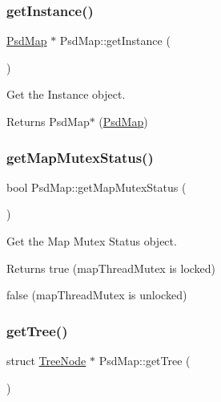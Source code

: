 \subsubsection{\texorpdfstring{get\+Instance()}{getInstance()}}
{\footnotesize\ttfamily \hyperlink{class_psd_map}{Psd\+Map} $\ast$ Psd\+Map\+::get\+Instance (\begin{DoxyParamCaption}{ }\end{DoxyParamCaption})\hspace{0.3cm}{\ttfamily [static]}}



Get the Instance object. 

\begin{DoxyReturn}{Returns}
Psd\+Map$\ast$ (\hyperlink{class_psd_map}{Psd\+Map}) 
\end{DoxyReturn}
\mbox{\label{class_psd_map_a411472433a3037b0245e9c9f699672b4}} 
\subsubsection{\texorpdfstring{get\+Map\+Mutex\+Status()}{getMapMutexStatus()}}
{\footnotesize\ttfamily bool Psd\+Map\+::get\+Map\+Mutex\+Status (\begin{DoxyParamCaption}{ }\end{DoxyParamCaption})}



Get the Map Mutex Status object. 

\begin{DoxyReturn}{Returns}
true (map\+Thread\+Mutex is locked) 

false (map\+Thread\+Mutex is unlocked) 
\end{DoxyReturn}
\mbox{\label{class_psd_map_a69a64b755dbacc77737bf6e05686c001}} 
\subsubsection{\texorpdfstring{get\+Tree()}{getTree()}}
{\footnotesize\ttfamily struct \hyperlink{struct_tree_node}{Tree\+Node} $\ast$ Psd\+Map\+::get\+Tree (\begin{DoxyParamCaption}{ }\end{DoxyParamCaption})}



